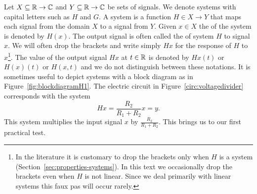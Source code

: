 Let $X \subseteq {\mathbb R} \to {\mathbb C}$ and $Y \subseteq {\mathbb R} \to {\mathbb C}$ be sets of signals.  We denote systems with capital letters such as $H$ and $G$.  A system is a function $H \in X \to Y$ that maps each signal from the domain $X$ to a signal from $Y$.  Given  $x \in X$ the  of the system is denoted by $H(x)$.  The output signal is often called the  of system $H$ to signal $x$.  We will often drop the brackets and write simply $Hx$ for the response of $H$ to $x$\footnote{In the literature it is customary to drop the brackets only when $H$ is a  system (Section~\ref{sec:properties-systems}).  In this text we occasionally drop the brackets even when $H$ is not linear.  Since we deal primarily with linear systems this faux pas will occur rarely.}.  The value of the output signal $Hx$ at $t \in {\mathbb R}$ is denoted by $Hx(t)$ or $H(x)(t)$ or $H(x,t)$ and we do not distinguish between these notations.   %
It is sometimes useful to depict systems with a block diagram as in Figure~\ref{fig:blockdiagramH1}.  The electric circuit in Figure~\ref{circ:voltagedivider} corresponds with the system
\[
Hx = \frac{R_2}{R_1 + R_2} x = y.
\]
This system multiplies the input signal $x$ by $\frac{R_2}{R_1 + R_2}$.  This brings us to our first practical test.

